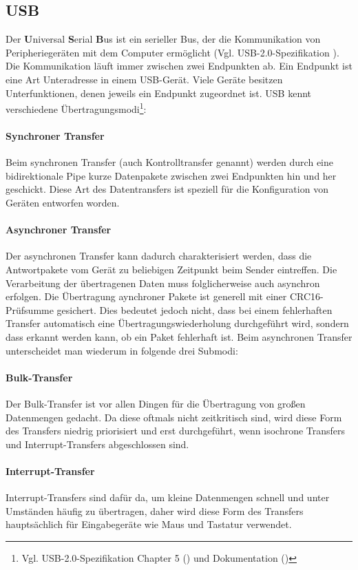 \subsection{USB}
Der \textbf{U}niversal \textbf{S}erial \textbf{B}us ist ein serieller Bus, der die Kommunikation von Peripheriegeräten mit dem Computer ermöglicht (Vgl. USB-2.0-Spezifikation \autocite{standard:usb2}).
Die Kommunikation läuft immer zwischen zwei Endpunkten ab.
Ein Endpunkt ist eine Art Unteradresse in einem USB-Gerät.
Viele Geräte besitzen Unterfunktionen, denen jeweils ein Endpunkt zugeordnet ist.
USB kennt verschiedene Übertragungsmodi\footnote{Vgl. USB-2.0-Spezifikation Chapter 5 (\autocite{standard:usb2}) und \libusb{} Dokumentation (\autocite{website:libusbx})}:

\paragraph{Synchroner Transfer}
Beim synchronen Transfer (auch Kontrolltransfer genannt) werden durch eine bidirektionale Pipe kurze Datenpakete zwischen zwei Endpunkten hin und her geschickt.
Diese Art des Datentransfers ist speziell für die Konfiguration von Geräten entworfen worden.

\paragraph{Asynchroner Transfer}
Der asynchronen Transfer kann dadurch charakterisiert werden, dass die Antwortpakete vom Gerät zu beliebigen Zeitpunkt beim Sender eintreffen.
Die Verarbeitung der übertragenen Daten muss folglicherweise auch asynchron erfolgen.
Die Übertragung aynchroner Pakete ist generell mit einer CRC16-Prüfsumme gesichert.
Dies bedeutet jedoch nicht, dass bei einem fehlerhaften Transfer automatisch eine Übertragungswiederholung durchgeführt wird, sondern dass erkannt werden kann, ob ein Paket fehlerhaft ist.
Beim asynchronen Transfer unterscheidet man wiederum in folgende drei Submodi:

\paragraph{Bulk-Transfer}
Der Bulk-Transfer ist vor allen Dingen für die Übertragung von großen Datenmengen gedacht.
Da diese oftmals nicht zeitkritisch sind, wird diese Form des Transfers niedrig priorisiert und erst durchgeführt, wenn isochrone Transfers und Interrupt-Transfers abgeschlossen sind.

\paragraph{Interrupt-Transfer}
Interrupt-Transfers sind dafür da, um kleine Datenmengen schnell und unter Umständen häufig zu übertragen, daher wird diese Form des Transfers hauptsächlich für Eingabegeräte wie Maus und Tastatur verwendet.

